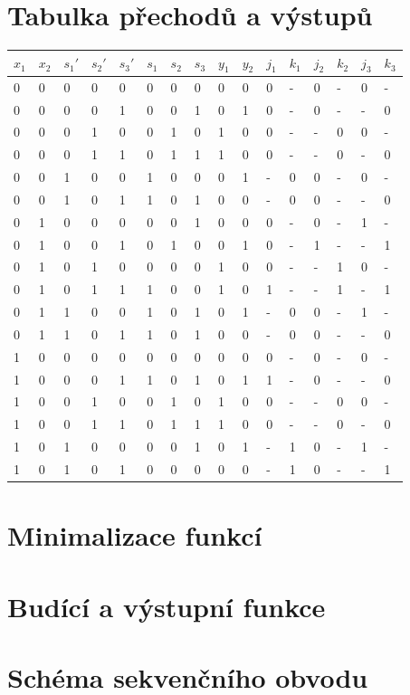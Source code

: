 \documentclass[titlepage]{article}
\begin{document}
\section{Tabulka přechodů a výstupů}
\begin{center}
\begin{tabular}{|l|l|l|l|l|l|l|l|l|l|l|l|l|l|l|l|}
\hline
{\bf $x_1$} & {\bf $x_2$} & {\bf $s_1'$} & {\bf $s_2'$} & {\bf $s_3'$} & {\bf
$s_1$} & {\bf $s_2$} & {\bf $s_3$} & {\bf $y_1$} & {\bf $y_2$} & {\bf $j_1$} & {\bf $k_1$} & {\bf $j_2$} & {\bf $k_2$} & {\bf $j_3$} & {\bf $k_3$}\\
\hline
0 & 0 & 0 & 0 & 0 & 0 & 0 & 0 & 0 & 0 & 0 & - & 0 & - & 0 & - \\
0 & 0 & 0 & 0 & 1 & 0 & 0 & 1 & 0 & 1 & 0 & - & 0 & - & - & 0 \\
0 & 0 & 0 & 1 & 0 & 0 & 1 & 0 & 1 & 0 & 0 & - & - & 0 & 0 & - \\
0 & 0 & 0 & 1 & 1 & 0 & 1 & 1 & 1 & 0 & 0 & - & - & 0 & - & 0 \\
0 & 0 & 1 & 0 & 0 & 1 & 0 & 0 & 0 & 1 & - & 0 & 0 & - & 0 & - \\
0 & 0 & 1 & 0 & 1 & 1 & 0 & 1 & 0 & 0 & - & 0 & 0 & - & - & 0 \\
0 & 1 & 0 & 0 & 0 & 0 & 0 & 1 & 0 & 0 & 0 & - & 0 & - & 1 & - \\
0 & 1 & 0 & 0 & 1 & 0 & 1 & 0 & 0 & 1 & 0 & - & 1 & - & - & 1 \\
0 & 1 & 0 & 1 & 0 & 0 & 0 & 0 & 1 & 0 & 0 & - & - & 1 & 0 & - \\
0 & 1 & 0 & 1 & 1 & 1 & 0 & 0 & 1 & 0 & 1 & - & - & 1 & - & 1 \\
0 & 1 & 1 & 0 & 0 & 1 & 0 & 1 & 0 & 1 & - & 0 & 0 & - & 1 & - \\
0 & 1 & 1 & 0 & 1 & 1 & 0 & 1 & 0 & 0 & - & 0 & 0 & - & - & 0 \\
1 & 0 & 0 & 0 & 0 & 0 & 0 & 0 & 0 & 0 & 0 & - & 0 & - & 0 & - \\
1 & 0 & 0 & 0 & 1 & 1 & 0 & 1 & 0 & 1 & 1 & - & 0 & - & - & 0 \\
1 & 0 & 0 & 1 & 0 & 0 & 1 & 0 & 1 & 0 & 0 & - & - & 0 & 0 & - \\
1 & 0 & 0 & 1 & 1 & 0 & 1 & 1 & 1 & 0 & 0 & - & - & 0 & - & 0 \\
1 & 0 & 1 & 0 & 0 & 0 & 0 & 1 & 0 & 1 & - & 1 & 0 & - & 1 & - \\
1 & 0 & 1 & 0 & 1 & 0 & 0 & 0 & 0 & 0 & - & 1 & 0 & - & - & 1 \\
\hline
\end{tabular}
\end{center}
\section{Minimalizace funkcí}
\section{Budící a výstupní funkce}
\section{Schéma sekvenčního obvodu}
\end{document}
